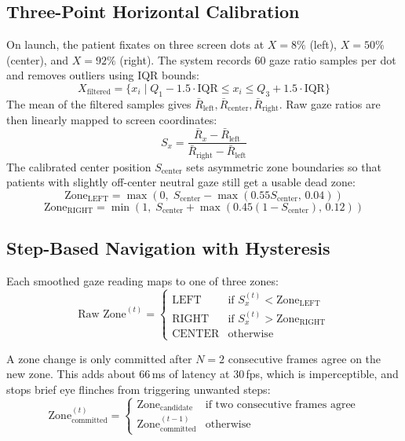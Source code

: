 \documentclass[conference]{IEEEtran}
\begin{document}
\subsection{Three-Point Horizontal Calibration}
On launch, the patient fixates on three screen dots at $X = 8\%$ (left), $X = 50\%$ (center),
and $X = 92\%$ (right). The system records 60 gaze ratio samples per dot and removes
outliers using IQR bounds:
\begin{equation}
X_{\text{filtered}} = \{x_i \mid Q_1 - 1.5\cdot\text{IQR} \le x_i \le Q_3 + 1.5\cdot\text{IQR}\}
\end{equation}
The mean of the filtered samples gives $\bar{R}_{\text{left}}, \bar{R}_{\text{center}},
\bar{R}_{\text{right}}$. Raw gaze ratios are then linearly mapped to screen coordinates:
\begin{equation}
S_x = \frac{\bar{R}_x - \bar{R}_{\text{left}}}{\bar{R}_{\text{right}} - \bar{R}_{\text{left}}}
\end{equation}
The calibrated center position $S_{\text{center}}$ sets asymmetric zone boundaries so that
patients with slightly off-center neutral gaze still get a usable dead zone:
\begin{equation}
\text{Zone}_{\text{LEFT}} = \max\!\left(0, \; S_{\text{center}} - \max(0.55 S_{\text{center}},\, 0.04)\right)
\end{equation}
\begin{equation}
\text{Zone}_{\text{RIGHT}} = \min\!\left(1, \; S_{\text{center}} + \max(0.45(1 - S_{\text{center}}),\, 0.12)\right)
\end{equation}

\subsection{Step-Based Navigation with Hysteresis}
Each smoothed gaze reading maps to one of three zones:
\begin{equation}
\text{Raw Zone}^{(t)} = \begin{cases}
\text{LEFT} & \text{if } S_x^{(t)} < \text{Zone}_{\text{LEFT}} \\
\text{RIGHT} & \text{if } S_x^{(t)} > \text{Zone}_{\text{RIGHT}} \\
\text{CENTER} & \text{otherwise}
\end{cases}
\end{equation}

A zone change is only committed after $N = 2$ consecutive frames agree on the new zone. This
adds about 66\,ms of latency at 30\,fps, which is imperceptible, and stops brief eye flinches
from triggering unwanted steps:
\begin{equation}
\text{Zone}_{\text{committed}}^{(t)} = \begin{cases}
\text{Zone}_{\text{candidate}} & \text{if two consecutive frames agree} \\
\text{Zone}_{\text{committed}}^{(t-1)} & \text{otherwise}
\end{cases}
\end{equation}
\end{document}
